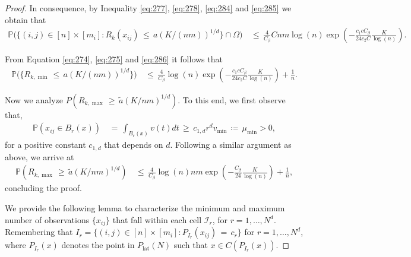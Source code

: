 \documentclass[twoside,11pt]{article}
\begin{document}
\begin{proof}
In consequence, by Inequality \eqref{eq:277}, \eqref{eq:278}, \eqref{eq:284} and \eqref{eq:285} we obtain that
\begin{align}
    \mathbb{P}\Bigg( \{ (i,j) \in [n] \times [m_i] : R_{k}(x_{ij}) \,\leq\, a(K/(nm))^{1/d} \} \cap  \Omega \Bigg) 
    &\,\leq\, \frac{4}{C_{\beta}} Cnm \log(n) \exp\left(-\frac{c_1cC_{\beta}}{24c_2C} \frac{K}{ \log(n)} \right). \label{eq:286}
\end{align}

From Equation \eqref{eq:274}, \eqref{eq:275} and \eqref{eq:286} it follows that
\begin{align}
    \mathbb{P}\Bigg( \{ R_{k,\min} \,\leq\, a(K/(nm))^{1/d} \} \Bigg) 
    &\,\leq\, \frac{4}{C_{\beta}} \log(n) \exp\left(-\frac{c_1cC_{\beta}}{24c_2C} \frac{K}{ \log(n)} \right) + \frac{1}{n}. \label{eq:287}
\end{align}

Now we analyze \( P(R_{k,\max} \,\geq\, \tilde{a}(K/nm)^{1/d}) \). To this end, we first observe that,
\begin{align}
    \mathbb{P}(x_{ij} \in B_{r}(x)) &\,=\, \int_{B_{r}(x)} v(t)dt \,\geq\, c_{1,d}r^d v_{\min} \,\coloneqq\,  \mu_{\min} > 0,
\end{align}
for a positive constant \( c_{1,d} \) that depends on \( d \). Following a similar argument as above, we arrive at
\begin{align}
    \mathbb{P}(R_{k,\max} \,\geq\, \tilde{a}(K/nm)^{1/d}) 
    &\,\leq\, \frac{4}{C_{\beta}} \log(n)nm \exp\left(-\frac{C_{\beta}}{24} \frac{K}{\log(n)} \right) + \frac{1}{n}, 
\end{align}
concluding the proof.

We provide the following lemma to characterize the minimum and maximum number of observations \(\{x_{ij}\}\) that fall within each cell \(\mathcal{I}_r\), for \(r = 1, \ldots, N^d\). Remembering that \(I_r = \{(i,j) \in [n] \times [m_i] : P_{I_r}(x_{ij}) \,=\, c_r\}\) for \(r = 1, \ldots, N^d\), where \(P_{I_r}(x)\) denotes the point in \(P_{\text{lat}}(N)\) such that \(x \in C(P_{I_r}(x))\).
\end{proof}
\end{document}
